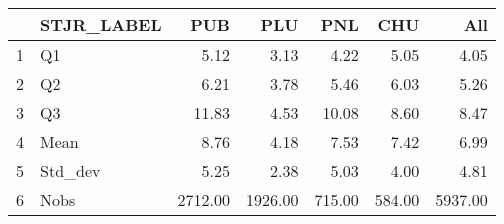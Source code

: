 \begin{table}[ht]
\centering
\begin{tabular}{rlrrrrr}
  \hline
 & STJR\_LABEL & PUB & PLU & PNL & CHU & All \\ 
  \hline
1 & Q1 & 5.12 & 3.13 & 4.22 & 5.05 & 4.05 \\ 
  2 & Q2 & 6.21 & 3.78 & 5.46 & 6.03 & 5.26 \\ 
  3 & Q3 & 11.83 & 4.53 & 10.08 & 8.60 & 8.47 \\ 
  4 & Mean & 8.76 & 4.18 & 7.53 & 7.42 & 6.99 \\ 
  5 & Std\_dev & 5.25 & 2.38 & 5.03 & 4.00 & 4.81 \\ 
  6 & Nobs & 2712.00 & 1926.00 & 715.00 & 584.00 & 5937.00 \\ 
   \hline
\end{tabular}
\end{table}
